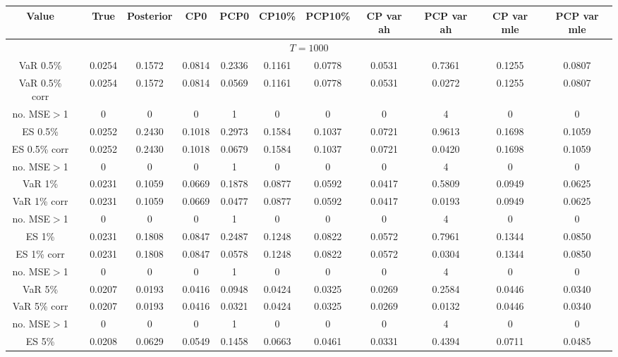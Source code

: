 { \tiny 
{ \renewcommand{\arraystretch}{1.1} 
\begin{sidewaystable} 
\center 
\begin{tabular}{cc cc | cccc | cccc} 
Value && True & Posterior & CP0  & PCP0 & CP10\%  & PCP10\% &CP var ah & PCP var ah & CP var mle & PCP var mle \\ \hline 
\hline 
\multicolumn{12}{c}{$T =1000$}  \\ 
\hline 
VaR 0.5\% && 0.0254 & 0.1572 & 0.0814 & 0.2336 & 0.1161 & 0.0778 &0.0531 & 0.7361 & 0.1255 & 0.0807 \\ 
VaR 0.5\% corr && 0.0254 & 0.1572 & 0.0814 & 0.0569 & 0.1161 & 0.0778 &0.0531 & 0.0272 & 0.1255 & 0.0807 \\ 
no. MSE$>$1 && 0 & 0 & 0 & 1 & 0 & 0 &0 & 4 & 0 & 0 \\[1ex] 
ES 0.5\% && 0.0252 & 0.2430 & 0.1018 & 0.2973 & 0.1584 & 0.1037 &0.0721 & 0.9613 & 0.1698 & 0.1059 \\ 
ES 0.5\% corr && 0.0252 & 0.2430 & 0.1018 & 0.0679 & 0.1584 & 0.1037 &0.0721 & 0.0420 & 0.1698 & 0.1059 \\ 
no. MSE$>$1 && 0 & 0 & 0 & 1 & 0 & 0 &0 & 4 & 0 & 0 \\[1.5ex]  
 \rowcolor{LightCyan} 
VaR 1\% && 0.0231 & 0.1059 & 0.0669 & 0.1878 & 0.0877 & 0.0592 &0.0417 & 0.5809 & 0.0949 & 0.0625 \\  
 \rowcolor{LightCyan} 
VaR 1\% corr && 0.0231 & 0.1059 & 0.0669 & 0.0477 & 0.0877 & 0.0592 &0.0417 & 0.0193 & 0.0949 & 0.0625 \\ 
 \rowcolor{LightCyan} 
no. MSE$>$1 && 0 & 0 & 0 & 1 & 0 & 0 &0 & 4 & 0 & 0 \\[1ex] 
 \rowcolor{LightCyan} 
ES 1\% && 0.0231 & 0.1808 & 0.0847 & 0.2487 & 0.1248 & 0.0822 &0.0572 & 0.7961 & 0.1344 & 0.0850 \\ 
 \rowcolor{LightCyan} 
ES 1\% corr && 0.0231 & 0.1808 & 0.0847 & 0.0578 & 0.1248 & 0.0822 &0.0572 & 0.0304 & 0.1344 & 0.0850 \\ 
 \rowcolor{LightCyan} 
no. MSE$>$1 && 0 & 0 & 0 & 1 & 0 & 0 &0 & 4 & 0 & 0 \\[1.5ex] 
VaR 5\% && 0.0207 & 0.0193 & 0.0416 & 0.0948 & 0.0424 & 0.0325 &0.0269 & 0.2584 & 0.0446 & 0.0340 \\ 
VaR 5\% corr && 0.0207 & 0.0193 & 0.0416 & 0.0321 & 0.0424 & 0.0325 &0.0269 & 0.0132 & 0.0446 & 0.0340 \\ 
no. MSE$>$1 && 0 & 0 & 0 & 1 & 0 & 0 &0 & 4 & 0 & 0 \\[1ex] 
ES 5\% && 0.0208 & 0.0629 & 0.0549 & 0.1458 & 0.0663 & 0.0461 &0.0331 & 0.4394 & 0.0711 & 0.0485 \\ 

\end{tabular}
\end{sidewaystable}}}
